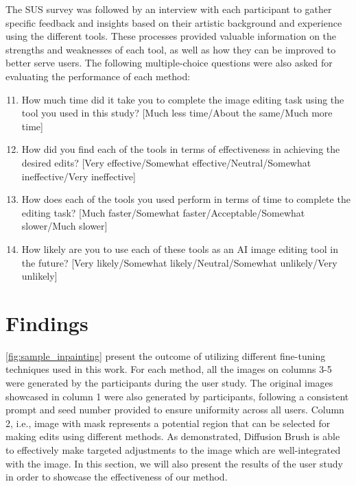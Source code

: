 \documentclass[10pt,twocolumn,letterpaper]{article}
\newcommand{\subscript}[2]{$#1 _ #2$}
\begin{document}
The SUS survey was followed by an interview with each participant to gather specific feedback and insights based on their artistic background and experience using the different tools. These processes provided valuable information on the strengths and weaknesses of each tool, as well as how they can be improved to better serve users. The following multiple-choice questions were also asked for evaluating the performance of each method:
\begin{enumerate}[label=\subscript{\textbf{Q}}{\textbf{{\arabic*}}}]
\setcounter{enumi}{10}
\item How much time did it take you to complete the image editing task using the tool you used in this study? [Much less time/About the same/Much more time]

\item How did you find each of the tools in terms of effectiveness in achieving the desired edits? [Very effective/Somewhat effective/Neutral/Somewhat ineffective/Very ineffective]

\item How does each of the tools you used perform in terms of time to complete the editing task? [Much faster/Somewhat faster/Acceptable/Somewhat slower/Much slower]

\item How likely are you to use each of these tools as an AI image editing tool in the future? [Very likely/Somewhat likely/Neutral/Somewhat unlikely/Very unlikely]

\end{enumerate}
\section{Findings}

\cref{fig:sample_inpainting} present the outcome of utilizing different fine-tuning techniques used in this work. For each method, all the images on columns 3-5 were generated by the participants during the user study. The original images showcased in column 1 were also generated by participants, following a consistent prompt and seed number provided to ensure uniformity across all users. Column 2, i.e., image with mask represents a potential region that can be selected for making edits using different methods. As demonstrated, Diffusion Brush is able to effectively make targeted adjustments to the image which are well-integrated with the image. In this section, we will also present the results of the user study in order to showcase the effectiveness of our method.
\end{document}

